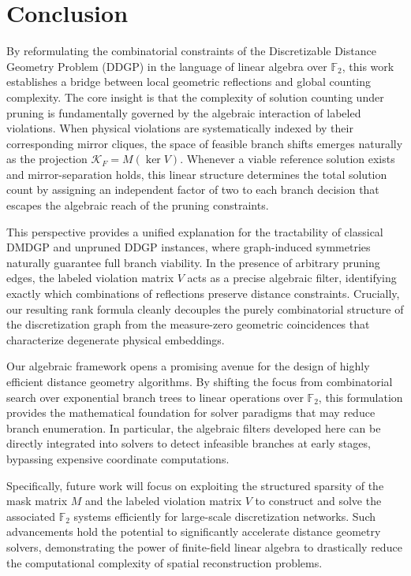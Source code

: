 \section{Conclusion}
\label{sec:conclusion}

By reformulating the combinatorial constraints of the Discretizable Distance Geometry Problem (DDGP) in the language of linear algebra over $\mathbb{F}_2$, this work establishes a bridge between local geometric reflections and global counting complexity. The core insight is that the complexity of solution counting under pruning is fundamentally governed by the algebraic interaction of labeled violations. When physical violations are systematically indexed by their corresponding mirror cliques, the space of feasible branch shifts emerges naturally as the projection $\mathcal{K}_F = M(\ker V)$. Whenever a viable reference solution exists and mirror-separation holds, this linear structure determines the total solution count by assigning an independent factor of two to each branch decision that escapes the algebraic reach of the pruning constraints.

This perspective provides a unified explanation for the tractability of classical DMDGP and unpruned DDGP instances, where graph-induced symmetries naturally guarantee full branch viability. In the presence of arbitrary pruning edges, the labeled violation matrix $V$ acts as a precise algebraic filter, identifying exactly which combinations of reflections preserve distance constraints. Crucially, our resulting rank formula cleanly decouples the purely combinatorial structure of the discretization graph from the measure-zero geometric coincidences that characterize degenerate physical embeddings.

Our algebraic framework opens a promising avenue for the design of highly efficient distance geometry algorithms. By shifting the focus from combinatorial search over exponential branch trees to linear operations over $\mathbb{F}_2$, this formulation provides the mathematical foundation for solver paradigms that may reduce branch enumeration. In particular, the algebraic filters developed here can be directly integrated into solvers to detect infeasible branches at early stages, bypassing expensive coordinate computations.

Specifically, future work will focus on exploiting the structured sparsity of the mask matrix $M$ and the labeled violation matrix $V$ to construct and solve the associated $\mathbb{F}_2$ systems efficiently for large-scale discretization networks. Such advancements hold the potential to significantly accelerate distance geometry solvers, demonstrating the power of finite-field linear algebra to drastically reduce the computational complexity of spatial reconstruction problems.